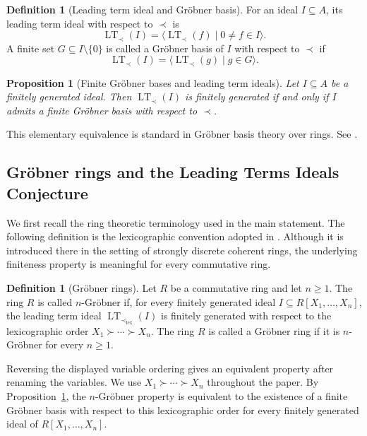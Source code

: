 \documentclass[preprint,12pt,3p]{elsarticle}
\newtheorem{proposition}[theorem]{Proposition}
\theoremstyle{definition}
\newtheorem{definition}[theorem]{Definition}
\theoremstyle{remark}
\newcommand{\LT}{\operatorname{LT}}
\begin{document}
	\begin{definition}[Leading term ideal and Gr\"obner basis]
		\label{def:leading-term-ideal}
		For an ideal $I\subseteq A$, its leading term ideal with respect to
		$\prec$ is
		\[
		\LT_\prec(I)
		=
		\bigl\langle \LT_\prec(f)\mid 0\neq f\in I\bigr\rangle.
		\]
		A finite set $G\subseteq I\setminus\{0\}$ is called a Gr\"obner
		basis of $I$ with respect to $\prec$ if
		\[
		\LT_\prec(I)
		=
		\bigl\langle \LT_\prec(g)\mid g\in G\bigr\rangle.
		\]
	\end{definition}
	
	\begin{proposition}[Finite Gr\"obner bases and leading term ideals]
		\label{prop:finite-grobner-basis}
		Let $I\subseteq A$ be a finitely generated ideal. Then
		$\LT_\prec(I)$ is finitely generated if and only if $I$ admits a
		finite Gr\"obner basis with respect to $\prec$.
	\end{proposition}
	
	This elementary equivalence is standard in Gr\"obner basis theory
	over rings. See
	\cite{AdamsLoustaunau1994,Pauer2007,LombardiNeuwirthYengui2026}.
	
	\subsection{Gr\"obner rings and the Leading Terms Ideals Conjecture}
	
	We first recall the ring theoretic terminology used in the main
	statement. The following definition is the lexicographic convention
	adopted in \cite[Definition~215]{Yengui2015Book}. Although it is
	introduced there in the setting of strongly discrete coherent rings,
	the underlying finiteness property is meaningful for every
	commutative ring.
	
	\begin{definition}[Gr\"obner rings]
		\label{def:grobner-ring-book}
		Let $R$ be a commutative ring and let $n\geq 1$. The ring $R$ is
		called $n$-Gr\"obner if, for every finitely generated ideal
		$I\subseteq R[X_1,\ldots,X_n]$, the leading term ideal
		$\LT_{\prec_{\mathrm{lex}}}(I)$ is finitely generated with respect
		to the lexicographic order
		$X_1\succ\cdots\succ X_n$. The ring $R$ is called a Gr\"obner ring
		if it is $n$-Gr\"obner for every $n\geq 1$.
	\end{definition}
	
	Reversing the displayed variable ordering gives an equivalent
	property after renaming the variables. We use
	$X_1\succ\cdots\succ X_n$ throughout the paper. By
	Proposition~\ref{prop:finite-grobner-basis}, the $n$-Gr\"obner
	property is equivalent to the existence of a finite Gr\"obner basis
	with respect to this lexicographic order for every finitely generated
	ideal of $R[X_1,\ldots,X_n]$.
	
\end{document}

